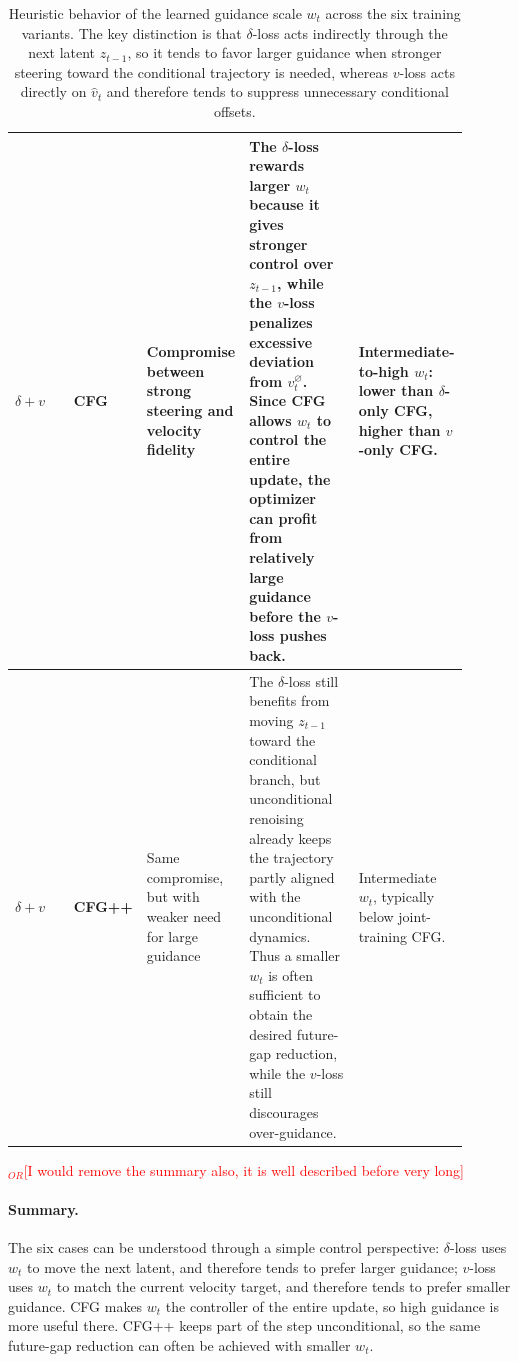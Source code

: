 \documentclass[acmtog]{acmart}
\newcommand{\orz}[1]{\textcolor{red}{$_{OR}$[#1]}}
\begin{document}
\begin{table}[t]
\begin{tabular}{p{0.14\linewidth} p{0.11\linewidth} p{0.18\linewidth} p{0.25\linewidth} p{0.22\linewidth}}
\midrule

\textbf{\(\delta{+}v\)} & \textbf{CFG} &
Compromise between strong steering and velocity fidelity &
The \(\delta\)-loss rewards larger \(w_t\) because it gives stronger control over \(z_{t-1}\), while the \(v\)-loss penalizes excessive deviation from \(v_t^{\varnothing}\). Since CFG allows \(w_t\) to control the entire update, the optimizer can profit from relatively large guidance before the \(v\)-loss pushes back. &
Intermediate-to-high \(w_t\): lower than \(\delta\)-only CFG, higher than \(v\)-only CFG. \\

\midrule

\textbf{\(\delta{+}v\)} & \textbf{CFG++} &
Same compromise, but with weaker need for large guidance &
The \(\delta\)-loss still benefits from moving \(z_{t-1}\) toward the conditional branch, but unconditional renoising already keeps the trajectory partly aligned with the unconditional dynamics. Thus a smaller \(w_t\) is often sufficient to obtain the desired future-gap reduction, while the \(v\)-loss still discourages over-guidance. &
Intermediate \(w_t\), typically below joint-training CFG. \\

\bottomrule
\end{tabular}
\caption{Heuristic behavior of the learned guidance scale \(w_t\) across the six training variants. The key distinction is that \(\delta\)-loss acts indirectly through the next latent \(z_{t-1}\), so it tends to favor larger guidance when stronger steering toward the conditional trajectory is needed, whereas \(v\)-loss acts directly on \(\hat v_t\) and therefore tends to suppress unnecessary conditional offsets.}
\label{tab:six_variants_w}
\end{table}

\orz{I would remove the summary also, it is well described before very long}
\paragraph{Summary.}
The six cases can be understood through a simple control perspective:
\(\delta\)-loss uses \(w_t\) to move the next latent, and therefore tends to prefer larger guidance;
\(v\)-loss uses \(w_t\) to match the current velocity target, and therefore tends to prefer smaller guidance.
CFG makes \(w_t\) the controller of the entire update, so high guidance is more useful there.
CFG++ keeps part of the step unconditional, so the same future-gap reduction can often be achieved with smaller \(w_t\).
\end{document}
